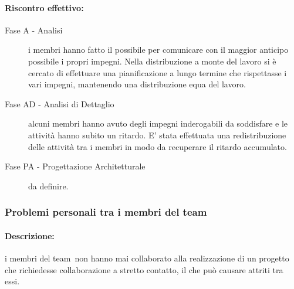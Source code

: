 \documentclass[../PianoProgetto.tex]{subfiles}
\begin{document}
	\paragraph*{Riscontro effettivo:}
		\begin{description}
			\item[Fase A - Analisi] i membri hanno fatto il possibile per comunicare con il maggior anticipo possibile i propri impegni. Nella distribuzione a monte del lavoro si è cercato di effettuare una pianificazione a lungo termine che rispettasse i vari impegni, mantenendo una distribuzione equa del lavoro.
			\item[Fase AD - Analisi di Dettaglio] alcuni membri hanno avuto degli impegni inderogabili da soddisfare e le attività hanno subito un ritardo. E' stata effettuata una redistribuzione delle attività tra i membri in modo da recuperare il ritardo accumulato. 
			\item[Fase PA - Progettazione Architetturale] da definire.
		\end{description}
	
\subsubsection{Problemi personali tra i membri del team}
\label{sec:Problemi personali tra i membri del team}

	\paragraph*{Descrizione:} i membri del team\g\ non hanno mai collaborato alla realizzazione di un progetto che richiedesse collaborazione a stretto contatto, il che può causare attriti tra essi.
	
	
\end{document}
